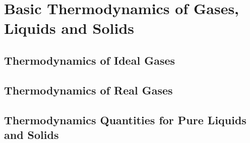 \chapter{Basic Thermodynamics of Gases, Liquids and Solids}
\section{Thermodynamics of Ideal Gases}
\section{Thermodynamics of Real Gases}
\section{Thermodynamics Quantities for Pure Liquids and Solids}
